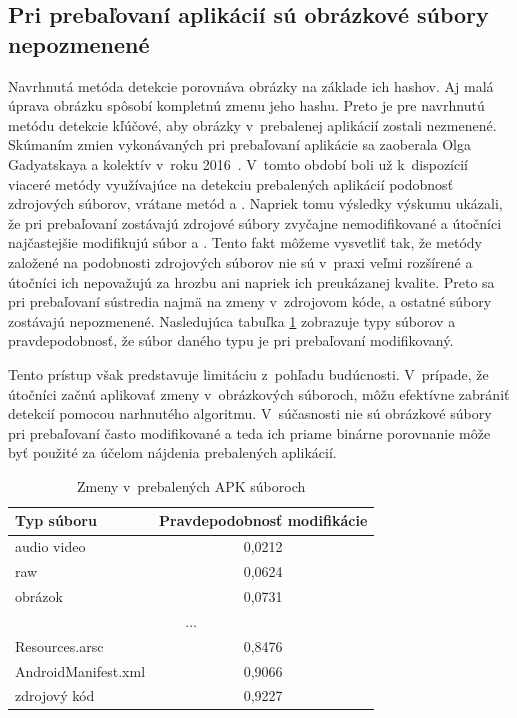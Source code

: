 \subsection*{Pri prebaľovaní aplikácií sú obrázkové súbory nepozmenené}
Navrhnutá metóda detekcie porovnáva obrázky na základe ich hashov. Aj malá úprava obrázku spôsobí kompletnú zmenu jeho hashu. Preto je pre navrhnutú metódu detekcie kľúčové, aby obrázky v~prebalenej aplikácií zostali nezmenené. Skúmaním zmien vykonávaných pri prebaľovaní aplikácie sa zaoberala Olga Gadyatskaya a kolektív v~roku 2016~\cite{Gadyatskaya2016}. V~tomto období boli už k~dispozícií viaceré metódy využívajúce na detekciu prebalených aplikácií podobnosť zdrojových súborov, vrátane metód  a . Napriek tomu výsledky výskumu ukázali, že pri prebaľovaní zostávajú zdrojové súbory zvyčajne nemodifikované a útočníci najčastejšie modifikujú súbor  a . Tento fakt môžeme vysvetliť tak, že metódy založené na podobnosti zdrojových súborov nie sú v~praxi veľmi rozšírené a útočníci ich nepovažujú za hrozbu ani napriek ich preukázanej kvalite. Preto sa pri prebaľovaní sústredia najmä na zmeny v~zdrojovom kóde, a ostatné súbory zostávajú nepozmenené. Nasledujúca tabuľka \ref{repacakged-changes} zobrazuje typy súborov a pravdepodobnosť, že súbor daného typu je pri prebaľovaní modifikovaný. 

Tento prístup však predstavuje limitáciu z~pohľadu budúcnosti. V~prípade, že útočníci začnú aplikovať zmeny v~obrázkových súboroch, môžu efektívne zabrániť detekcií pomocou narhnutého algoritmu. V~súčasnosti nie sú obrázkové súbory pri prebaľovaní často modifikované a teda ich priame binárne porovnanie môže byť použité za účelom nájdenia prebalených aplikácií.

\begin{table}[H]
\centering
\begin{tabular}{|l c|}
\hline
\textbf{Typ súboru}  & \textbf{Pravdepodobnosť modifikácie} \\ \hline
audio video  & 0,0212                                              \\
raw   & 0,0624                                                    \\
obrázok & 0,0731                                                  \\
\multicolumn{2}{|c|}{...} \\
Resources.arsc & 0,8476                                          \\
AndroidManifest.xml & 0,9066                                       \\
 zdrojový kód  & 0,9227                                           \\
\hline
\end{tabular}
\caption{Zmeny v~prebalených APK súboroch}
\label{repacakged-changes}
\end{table}

